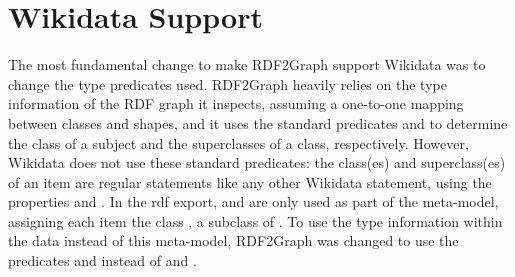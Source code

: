 
\section{Wikidata Support}
\label{sec:RDF2Graph+Wikidata:Wikidata}

The most fundamental change to make RDF2Graph support Wikidata
was %
to change the type predicates used.
RDF2Graph heavily relies on the type information of the RDF graph it inspects,
assuming a one-to-one mapping between classes and shapes,
and it uses the standard predicates  and 
to determine the class of a subject and the superclasses of a class, respectively.
However, Wikidata does not use these standard predicates:
the class(es) and superclass(es) of an item
are regular statements like any other Wikidata statement,
using the properties  and .
In the \gls{rdf} export,  and  are only used
as part of the meta-model, %
assigning each item the class , a subclass of .
To use the type information within the data instead of this meta-model,
RDF2Graph was changed to use the predicates  and  %
instead of  and .

